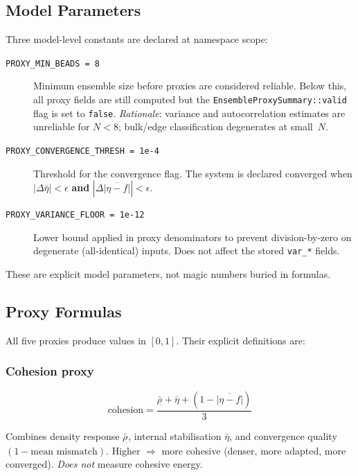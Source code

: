 \documentclass[11pt]{article}
\newcommand{\type}[1]{\texttt{#1}}
\begin{document}
\subsection{Model Parameters}

Three model-level constants are declared at namespace scope:

\begin{description}
  \item[\texttt{PROXY\_MIN\_BEADS = 8}]
    Minimum ensemble size before proxies are considered reliable.
    Below this, all proxy fields are still computed but the
    \type{EnsembleProxySummary::valid} flag is set to \texttt{false}.
    \textit{Rationale}: variance and autocorrelation estimates are unreliable
    for $N < 8$; bulk/edge classification degenerates at small~$N$.

  \item[\texttt{PROXY\_CONVERGENCE\_THRESH = 1e-4}]
    Threshold for the  convergence flag.
    The system is declared converged when
    $|\Delta\bar\eta| < \epsilon$ \textbf{and}
    $|\Delta\overline{|\eta - f|}| < \epsilon$.

  \item[\texttt{PROXY\_VARIANCE\_FLOOR = 1e-12}]
    Lower bound applied in proxy denominators to prevent division-by-zero
    on degenerate (all-identical) inputs.  Does not affect the stored
    \texttt{var\_*} fields.
\end{description}

These are explicit model parameters, not magic numbers buried in formulas.

\subsection{Proxy Formulas}
\label{sec:proxy_formulas}

All five proxies produce values in $[0, 1]$.  Their explicit definitions are:

\subsubsection{Cohesion proxy}
\begin{equation}
  \text{cohesion} = \frac{\bar\rho_{\hat{}} + \bar\eta
    + (1 - \overline{|\eta - f|})}{3}
  \label{eq:cohesion_proxy}
\end{equation}

Combines density response $\bar\rho_{\hat{}}$, internal stabilisation
$\bar\eta$, and convergence quality $(1 - \text{mean mismatch})$.
Higher $\Rightarrow$ more cohesive (denser, more adapted, more converged).
\textit{Does not} measure cohesive energy.
\end{document}
